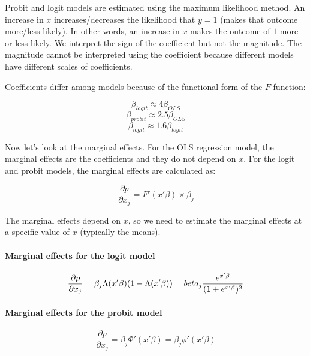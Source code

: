 
Probit and logit models are estimated using the maximum likelihood method. An increase in $x$
increases/decreases the likelihood that $y=1$ (makes that outcome more/less likely). In other words,
an increase in $x$ makes the outcome of $1$ more or less likely. We interpret the sign of the
coefficient but not the magnitude. The magnitude cannot be interpreted using the coefficient because
different models have different scales of coefficients.

Coefficients differ among models because of the functional form of the $F$ function:

$$\beta_{logit} \approx 4\beta_{OLS}$$
$$\beta_{probit} \approx 2.5\beta_{OLS}$$
$$\beta_{logit} \approx 1.6\beta_{logit}$$


Now let’s look at the marginal effects. For the OLS regression model, the marginal effects are the
coefficients and they do not depend on $x$. For the logit and probit models, the marginal effects
are calculated as:

\begin{equation}
    \frac{\partial p}{\partial x_j} = F'(x'\beta) \times \beta_j
\end{equation}

The marginal effects depend on $x$, so we need to estimate the marginal effects at a specific value
of $x$ (typically the means).

\paragraph{Marginal effects for the logit model}

\begin{equation}
    \frac{\partial p}{\partial x_j} = \beta_j\Lambda(x'\beta)(1-\Lambda(x'\beta)) =
    \\beta_j\frac{e^{x'\beta}}{(1+e^{x'\beta})^2}
\end{equation}

\paragraph{Marginal effects for the probit model}
\begin{equation}
    \frac{\partial p}{\partial x_j} = \beta_j\Phi'(x'\beta) = \beta_j\phi'(x'\beta)
\end{equation}

